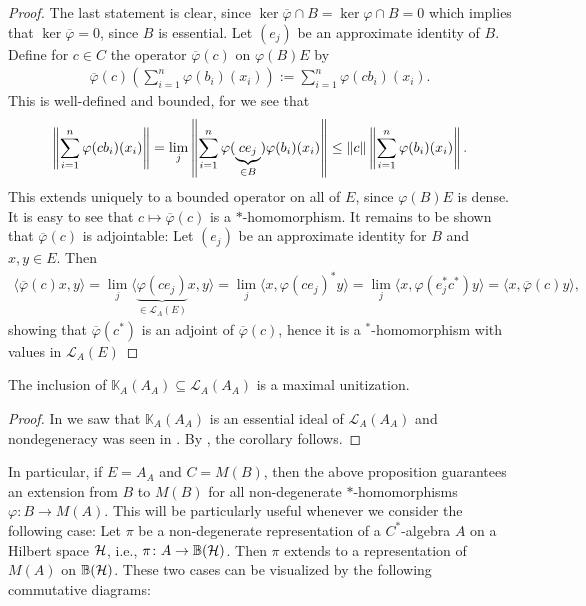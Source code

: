 \begin{proof}
	The last statement is clear, since $\ker \overline \varphi \cap B = \ker \varphi \cap B = 0$ which implies that $\ker \overline \varphi = 0$, since $B$ is essential. Let $(e_j)$ be an approximate identity of $B$. Define for $c \in C$ the operator $\overline \varphi(c)$ on $\varphi(B)E$ by
	\begin{align*}
		\overline \varphi(c) \left( \sum_{i=1}^n \varphi(b_i)(x_i) \right):= \sum_{i=1}^n \varphi(c b_i) (x_i).
	\end{align*}
	This is well-defined and bounded, for we see that
	\begin{align*}
		\left\lVert \sum_{i=1}^n \varphi(c b_i) (x_i) \right\rVert = \lim_{j} \left\lVert \sum_{i=1}^n \varphi(\underbrace{c e_j}_{\in B})\varphi(b_i) (x_i) \right\rVert \leq \left\lVert c \right\rVert \left\lVert \sum_{i=1}^n \varphi(b_i) (x_i)\right\rVert.
	\end{align*}
	This extends uniquely to a bounded operator on all of $E$, since $\varphi(B)E$ is dense. It is easy to see that $c \mapsto \overline \varphi(c)$ is a $*$-homomorphism. It remains to be shown that $\overline \varphi(c)$ is adjointable: Let $(e_j)$ be an approximate identity for $B$ and $x,y \in E$. Then
	\begin{align*}
		\langle \overline \varphi(c) x,y \rangle = \lim_{j} \langle \underbrace{\varphi(ce_j)}_{\in \mathcal{L}_A(E)} x, y \rangle = \lim_j \langle x , \varphi(ce_j)^* y\rangle = \lim_j  \langle x , \varphi(e_j^*c^*) y\rangle =  \langle  x, \overline \varphi(c) y\rangle,
	\end{align*}
	showing that $\overline \varphi(c^*)$ is an adjoint of $\overline \varphi (c)$, hence it is a $^*$-homomorphism with values in $\mathcal{L}_A(E)$
\end{proof}
\begin{corollary}
	The inclusion of $\mathbb{K}_A(A_A) \subseteq \mathcal{L}_A(A_A)$ is a maximal unitization.	
\end{corollary}
\begin{proof}
	In  we saw that $\mathbb{K}_A(A_A)$ is an essential ideal of $\mathcal{L}_A(A_A)$ and nondegeneracy was seen in . By , the corollary follows.
\end{proof}
In particular, if $E=A_A$ and $C = M(B)$, then the above proposition guarantees an extension from $B$ to $M(B)$ for all non-degenerate $*$-homomorphisms $\varphi \colon B \to M(A)$. This will be particularly useful whenever we consider the following case: Let $\pi$ be a non-degenerate representation of a $C^*$-algebra $A$ on a Hilbert space $\mathcal{H}$, i.e., $\pi \colon A \to \mathbb{B}(\mathcal{H})$. Then $\pi$ extends to a representation of $M(A)$ on $\mathbb{B}(\mathcal{H})$. These two cases can be visualized by the following commutative diagrams:
